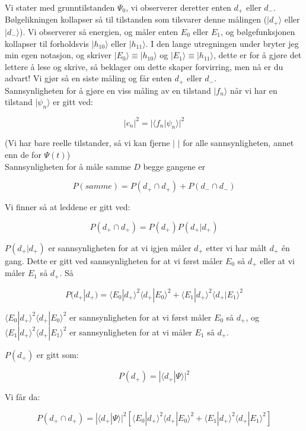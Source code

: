 \documentclass[a4paper,norsk, 10pt]{article}
\numberwithin{equation}{section}
\begin{document}
Vi stater med grunntilstanden $\Psi_0$, vi observerer deretter enten $d_+$ eller $d_-$. Bølgelikningen kollapser så til tilstanden som tilsvarer denne målingen ($|d_+\rangle$ eller $|d_-\rangle$). Vi observerer så energien, og måler enten $E_0$ eller $E_1$, og bølgefunksjonen kollapser til forholdsvis $|h_{10}\rangle$ eller $|h_{11}\rangle$. I den lange utregningen under bryter jeg min egen notasjon, og skriver $|E_0\rangle \equiv |h_{10}\rangle $ og $|E_1\rangle \equiv |h_{11}\rangle $, dette er for å gjøre det lettere å lese og skrive, så beklager om dette skaper forvirring, men nå er du advart! Vi gjør så en siste måling og får enten $d_+$ eller $d_-$.\\

Sannsynligheten for å gjøre en viss måling av en tilstand $| f_n\rangle$ når vi har en tilstand $|\psi_n\rangle$ er gitt ved:

$$
|c_n|^2 = |\langle f_n|\psi_n\rangle|^2
$$

(Vi har bare reelle tilstander, så vi kan fjerne $|$ $|$ for alle sannsynligheten, annet enn de for $\Psi(t)$)\\

Sannsynligheten for å måle samme $D$ begge gangene er

\begin{equation}
P(samme) = P(d_+ \cap d_+) + P(d_- \cap d_-)
\label{eq:Psamme}
\end{equation}

Vi finner så at leddene er gitt ved:

$$
P(d_+ \cap d_+) = P(d_+)P(d_+|d_+)
$$

$P(d_+|d_+)$ er sannsynligheten for at vi igjen måler $d_+$ etter vi har målt $d_+$ én gang. Dette er gitt ved sannsynligheten for at vi først måler $E_0$ så $d_+$ eller at vi måler $E_1$ så $d_+$. Så

$$
P(d_+|d_+) = \langle E_0|d_+\rangle^2\langle d_+|E_0\rangle^2 + \langle E_1|d_+\rangle^2\langle d_+|E_1\rangle^2
$$

$\langle E_0|d_+\rangle^2\langle d_+|E_0\rangle^2$ er sannsynligheten for at vi først måler $E_0$ så $d_+$, og $\langle E_1|d_+\rangle^2\langle d_+|E_1\rangle^2$ er sannsynligheten for at vi måler $E_1$ så $d_+$. 

$P(d_+)$ er gitt som:

$$
P(d_+) = |\langle d_+|\Psi\rangle|^2
$$

Vi får da:

$$
P(d_+ \cap d_+) = |\langle d_+|\Psi\rangle|^2\left[\langle E_0|d_+\rangle^2\langle d_+|E_0\rangle^2 + \langle E_1|d_+\rangle^2\langle d_+|E_1\rangle^2\right]
$$
\end{document}
